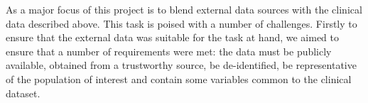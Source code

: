 \documentclass{article}
\begin{document}
As a major focus of this project is to blend external data sources with the clinical data described above. This task is poised with a number of challenges. Firstly to ensure that the external data was suitable for the task at hand, we aimed to ensure that a number of requirements were met: the data must be publicly available, obtained from a trustworthy source, be de-identified, be representative of the population of interest and contain some variables common to the clinical dataset.
\end{document}
